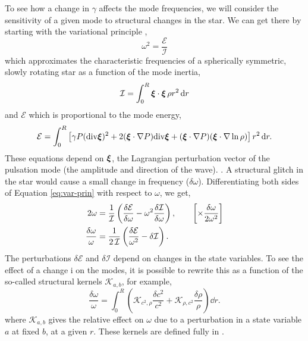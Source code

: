 To see how a change in \(\gamma\) affects the mode frequencies, we will consider the sensitivity of a given mode to structural changes in the star. We can get there by starting with the variational principle \citep{Chandrasekhar1964},
%
\begin{equation}
    \omega^2 = \frac{\mathcal{E}}{\mathcal{I}}\label{eq:var-prin}
\end{equation}
%
which approximates the characteristic frequencies of a spherically symmetric, slowly rotating star as a function of the mode inertia,
%
\begin{equation}
    \mathcal{I} = \int_0^R \bm{\xi} \cdot \bm{\xi} \, \rho r^2 \, \mathrm{d} r
\end{equation}
%
and \(\mathcal{E}\) which is proportional to the mode energy,
%
\begin{equation}
    \mathcal{E} = \int_0^R \left[\gamma P (\mathrm{div} \bm{\xi})^2 + 2(\bm{\xi}\cdot \nabla P) \mathrm{div} \bm{\xi} + (\bm{\xi}\cdot \nabla P) (\bm{\xi}\cdot\nabla\ln\rho)\right] r^2 \, \mathrm{d} r.
\end{equation}
%
These equations depend on \(\bm{\xi}\), the Lagrangian perturbation vector of the pulsation mode (the amplitude and direction of the wave). . A structural glitch in the star would cause a small change in frequency (\(\delta\omega\)). Differentiating both sides of Equation \ref{eq:var-prin} with respect to \(\omega\), we get,
%
\begin{align}
    2\omega &= \frac{1}{\mathcal{I}} \left( \frac{\delta\mathcal{E}}{\delta\omega} - \omega^2 \frac{\delta\mathcal{I}}{\delta\omega}\right), \qquad \left[\times \frac{\delta\omega}{2\omega^2}\right] \notag \\
    \frac{\delta\omega}{\omega} &= \frac{1}{2\,\mathcal{I}} \left(\frac{\delta\mathcal{E}}{\omega^2} - \delta\mathcal{I}\right).
\end{align}
%
The perturbations \(\delta\mathcal{E}\) and \(\delta\mathcal{I}\) depend on changes in the state variables. To see the effect of a change i on the modes, it is possible to rewrite this as a function of the so-called structural kernels \(\mathcal{K}_{a,b}\), for example,
%
\begin{equation}
    \frac{\delta\omega}{\omega} = \int_0^R \left(\mathcal{K}_{c^2,\rho} \frac{\delta c^2}{c^2} + \mathcal{K}_{\rho,c^2} \frac{\delta \rho}{\rho} \right) \dd r.\label{eq:kernels}
\end{equation}
%
where \(\mathcal{K}_{a, b}\) gives the relative effect on \(\omega\) due to a perturbation in a state variable \(a\) at fixed \(b\), at a given \(r\). These kernels are defined fully in \citet{Gough.Thompson1991}.

